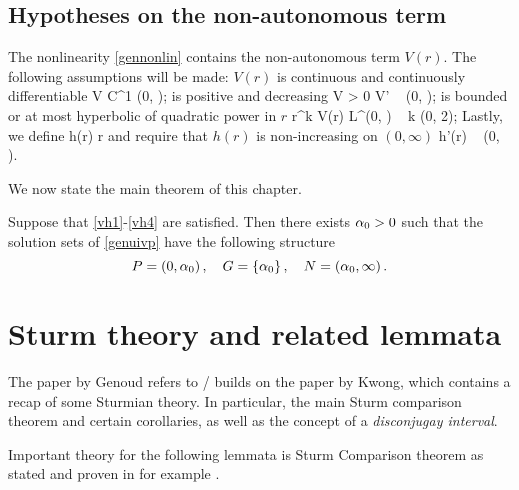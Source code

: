 \subsection{Hypotheses on the non-autonomous term}\label{hypv}
\donegroup
The nonlinearity \eqref{gennonlin} contains the non-autonomous term $V(r)$. The
following assumptions will be made: $V(r)$ is continuous and continuously 
differentiable
\be \label{vh1} 
    V \in C^1 (0, \infty); 
\ee
is positive and decreasing
\be \label{vh2} 
    V > 0 \quad {} \quad V'  \quad {} ~ (0, \infty);
\ee
is bounded or at most hyperbolic of quadratic power in $r$
\be \label{vh3}
    r^k V(r) \in L^\infty (0, \infty) \quad {} ~ k \in (0, 2);
\ee
Lastly, we define
\be \label{hdef} h(r) \coloneqq r  \ee
and require that $h(r)$ is non-increasing on $(0, \infty)$ 
\be \label{vh4} h'(r)  \quad {} ~ (0, \infty). \ee
\endgroup

We now state the main theorem of this chapter.
\begin{theorem} \label{genmain}
Suppose that \eqref{vh1}-\eqref{vh4} are satisfied. Then there exists $\alpha_0>0$ such
that the solution sets of \eqref{genuivp} have the following structure
\[
P = \left( 0, \alpha_0 \right), \quad G = \left\{ \alpha_0 \right\}, \quad N =
\left( \alpha_0, \infty \right).
\]
\end{theorem}

\section{Sturm theory and related lemmata}
\donegroup
The paper by Genoud {\red refers to / builds on} the paper by Kwong, which
contains a recap of some Sturmian theory. In particular, the main Sturm
comparison theorem and certain corollaries, as well as the concept of a
\emph{disconjugay interval}.

Important theory for the following lemmata is Sturm Comparison theorem as stated
and proven in for example \cite[p.~246]{kwong}.


